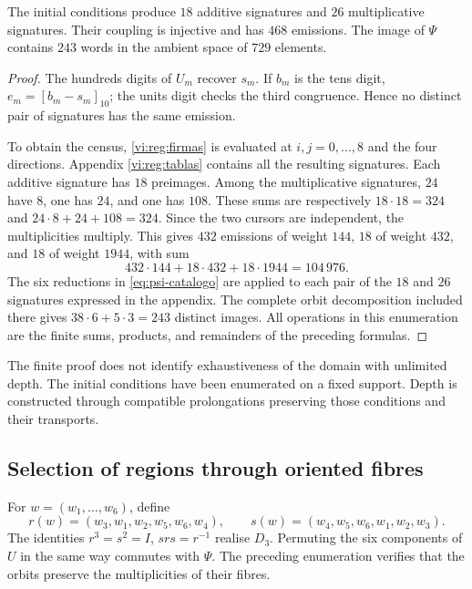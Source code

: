 \begin{proposition}
\label{vi:reg:censo}
The initial conditions produce \(18\) additive signatures and \(26\)
multiplicative signatures. Their coupling is injective and has \(468\)
emissions. The image of \(\Psi\) contains \(243\) words in the
ambient space of \(729\) elements.
\end{proposition}
\begin{proof}
The hundreds digits of \(U_m\) recover \(s_m\). If \(b_m\) is the
tens digit, \(e_m=[b_m-s_m]_{10}\); the units digit
checks the third congruence. Hence no distinct pair
of signatures has the same emission.

To obtain the census, \eqref{vi:reg:firmas} is evaluated at
\(i,j=0,\ldots,8\) and the four directions. Appendix
\ref{vi:reg:tablas} contains all the resulting signatures. Each
additive signature has \(18\) preimages. Among the multiplicative signatures,
\(24\) have \(8\), one has \(24\), and one has \(108\).
These sums are respectively \(18\cdot18=324\) and
\(24\cdot8+24+108=324\). Since the two cursors are
independent, the multiplicities multiply. This gives
\(432\) emissions of weight \(144\), \(18\) of weight \(432\), and
\(18\) of weight \(1944\), with sum
\[
 432\cdot144+18\cdot432+18\cdot1944=104\,976.
\]
The six reductions in \eqref{eq:psi-catalogo} are applied to each pair
of the \(18\) and \(26\) signatures expressed in the appendix. The
complete orbit decomposition included there gives
\(38\cdot6+5\cdot3=243\) distinct images. All
operations in this enumeration are the finite sums, products, and
remainders of the preceding formulas.
\end{proof}

The finite proof does not identify exhaustiveness of the domain with
unlimited depth. The initial conditions have been enumerated on
a fixed support. Depth is constructed through compatible
prolongations preserving those conditions and their transports.



\subsection{Selection of regions through oriented fibres}

For \(w=(w_1,\ldots,w_6)\), define
\[
 r(w)=(w_3,w_1,w_2,w_5,w_6,w_4),\qquad
 s(w)=(w_4,w_5,w_6,w_1,w_2,w_3).
\]
The identities \(r^3=s^2=I\), \(srs=r^{-1}\) realise
\(D_3\). Permuting the six components of \(U\) in the same way
commutes with \(\Psi\). The preceding enumeration verifies that the
orbits preserve the multiplicities of their fibres.

